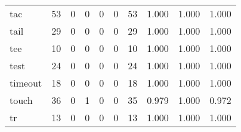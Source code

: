 \begin{longtable}{lp{2.0cm}p{2.0cm}p{2.0cm}p{2.0cm}p{2.0cm}p{2.0cm}p{2.0cm}p{2.0cm}p{2.0cm}}
tac       &                     53 &                                             0 &                                            0 &                                           0 &                                            0 &                                         53 &                                1.000 &                                  1.000 &                                1.000 \\
tail      &                     29 &                                             0 &                                            0 &                                           0 &                                            0 &                                         29 &                                1.000 &                                  1.000 &                                1.000 \\
tee       &                     10 &                                             0 &                                            0 &                                           0 &                                            0 &                                         10 &                                1.000 &                                  1.000 &                                1.000 \\
test      &                     24 &                                             0 &                                            0 &                                           0 &                                            0 &                                         24 &                                1.000 &                                  1.000 &                                1.000 \\
timeout   &                     18 &                                             0 &                                            0 &                                           0 &                                            0 &                                         18 &                                1.000 &                                  1.000 &                                1.000 \\
touch     &                     36 &                                             0 &                                            1 &                                           0 &                                            0 &                                         35 &                                0.979 &                                  1.000 &                                0.972 \\
tr        &                     13 &                                             0 &                                            0 &                                           0 &                                            0 &                                         13 &                                1.000 &                                  1.000 &                                1.000 \\

\end{longtable}
